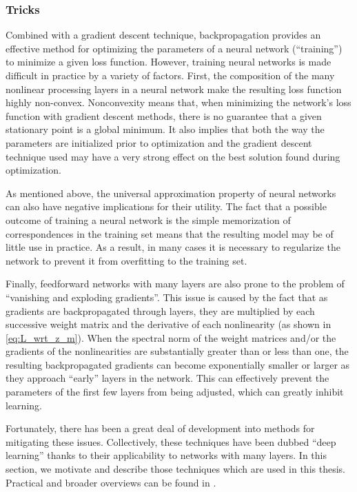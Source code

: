 \subsubsection{Tricks}

Combined with a gradient descent technique, backpropagation provides an effective method for optimizing the parameters of a neural network (``training'') to minimize a given loss function.
However, training neural networks is made difficult in practice by a variety of factors.
First, the composition of the many nonlinear processing layers in a neural network make the resulting loss function highly non-convex.
Nonconvexity means that, when minimizing the network's loss function with gradient descent methods, there is no guarantee that a given stationary point is a global minimum.
It also implies that both the way the parameters are initialized prior to optimization and the gradient descent technique used may have a very strong effect on the best solution found during optimization.

As mentioned above, the universal approximation property of neural networks can also have negative implications for their utility.
The fact that a possible outcome of training a neural network is the simple memorization of correspondences in the training set means that the resulting model may be of little use in practice.
As a result, in many cases it is necessary to regularize the network to prevent it from overfitting to the training set.

Finally, feedforward networks with many layers are also prone to the problem of ``vanishing and exploding gradients''.
This issue is caused by the fact that as gradients are backpropagated through layers, they are multiplied by each successive weight matrix and the derivative of each nonlinearity (as shown in \cref{eq:L_wrt_z_m}).
When the spectral norm of the weight matrices and/or the gradients of the nonlinearities are substantially greater than or less than one, the resulting backpropagated gradients can become exponentially smaller or larger as they approach ``early'' layers in the network.
This can effectively prevent the parameters of the first few layers from being adjusted, which can greatly inhibit learning.

Fortunately, there has been a great deal of development into methods for mitigating these issues.
Collectively, these techniques have been dubbed ``deep learning'' thanks to their applicability to networks with many layers.
In this section, we motivate and describe those techniques which are used in this thesis.
Practical and broader overviews can be found in \cite{bengio} \cite{lecun} \cite{nature}.

